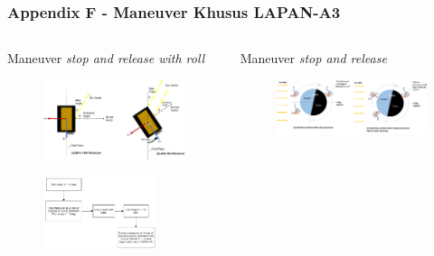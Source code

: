 \documentclass[8pt]{beamer}
\begin{document}
\begin{frame}
  \frametitle{Appendix F - Maneuver Khusus LAPAN-A3}
  \begin{columns}[T]
    \begin{block}{Maneuver \textit{stop and release with roll}}
      \begin{figure}
          \includegraphics[width=1.0\textwidth]{figure/maneuver2.png}
      \end{figure}
      \begin{figure}
          \includegraphics[width=0.8\textwidth]{figure/exmaneuver2.png}
      \end{figure}
    \end{block}
    \begin{block}{Maneuver \textit{stop and release}}
      \begin{figure}
          \includegraphics[width=1.0\textwidth]{figure/maneuver1.png}

\end{figure}
\end{block}
\end{columns}
\end{frame}
\end{document}
